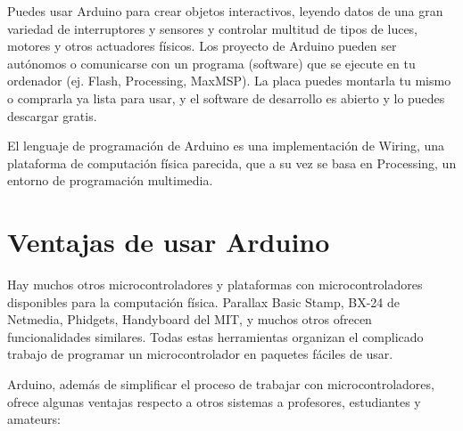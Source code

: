\documentclass[12pt,a4paper]{report}
\begin{document}
Puedes usar Arduino para crear objetos interactivos, leyendo datos de una gran
variedad de interruptores y sensores y controlar multitud de tipos de luces,
motores y otros actuadores físicos. Los proyecto de Arduino pueden ser autónomos
o comunicarse con un programa (software) que se ejecute en tu ordenador (ej.
Flash, Processing, MaxMSP). La placa puedes montarla tu mismo o comprarla ya
lista para usar, y el software de desarrollo es abierto y lo puedes descargar
gratis.

El lenguaje de programación de Arduino es una implementación de Wiring, una
plataforma de computación física parecida, que a su vez se basa en Processing,
un entorno de programación multimedia.


\section{Ventajas de usar Arduino}

Hay muchos otros microcontroladores y plataformas con microcontroladores
disponibles para la computación física. Parallax Basic Stamp, BX-24 de Netmedia,
Phidgets, Handyboard del MIT, y muchos otros ofrecen funcionalidades similares.
Todas estas herramientas organizan el complicado trabajo de programar un
microcontrolador en paquetes fáciles de usar.

Arduino, además de simplificar el proceso de trabajar con microcontroladores,
ofrece algunas ventajas respecto a otros sistemas a profesores, estudiantes y
amateurs:
\end{document}

